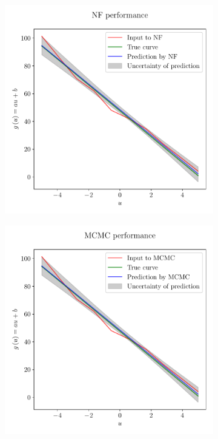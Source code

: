 \documentclass[a4paper,12pt]{report}
\begin{document}
\begin{figure}[h!]
	\centering
	\begin{subfigure}[t]{0.49\textwidth}
	\centering
	\includegraphics[width=\textwidth]{figures/nf-linear-regression-example-nfperformance.pdf}
	\end{subfigure}
	\hfill
	\begin{subfigure}[t]{0.49\textwidth}
	\centering
	\includegraphics[width=\textwidth]{figures/nf-linear-regression-example-mcmcperformance.pdf}

\end{subfigure}
\end{figure}
\end{document}
